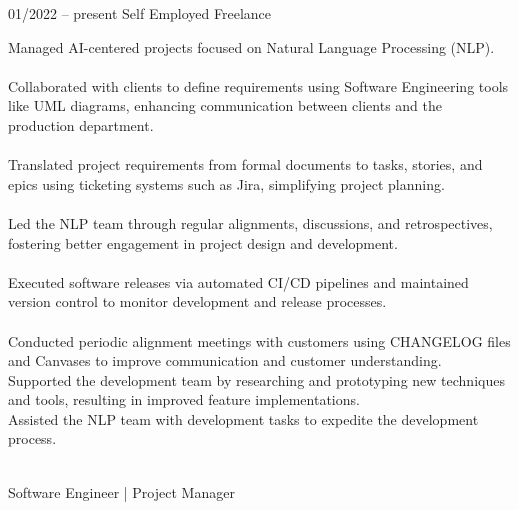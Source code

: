 \documentclass[9pt, green]{template/developercv} %
\begin{document}
{\begin{entrylist}
	\entry
{01/2022 -- present }
{}
{Self Employed \space\cpipe\space Freelance}
{
	\vspace{0.3mm}
	\begin{minipage}[t]{0.75\textwidth}				
		\vspace{-\baselineskip}
		\itemmarker Managed AI-centered projects focused on Natural Language Processing (NLP).\\
		\vspace{-3mm}\\
		\itemmarker Collaborated with clients to define requirements using Software Engineering tools like UML diagrams, enhancing communication between clients and the production department.\\
		\vspace{-3mm}\\
		\itemmarker Translated project requirements from formal documents to tasks, stories, and epics using ticketing systems such as Jira, simplifying project planning.\\
		\vspace{-3mm}\\
		\itemmarker Led the NLP team through regular alignments, discussions, and retrospectives, fostering better engagement in project design and development.\\
		\vspace{-3mm}\\
		\itemmarker Executed software releases via automated CI/CD pipelines and maintained version control to monitor development and release processes.\\
        \vspace{-3mm}\\
		\itemmarker Conducted periodic alignment meetings with customers using CHANGELOG files and Canvases to improve communication and customer understanding.\\
		\itemmarker Supported the development team by researching and prototyping new techniques and tools, resulting in improved feature implementations.\\
		\itemmarker Assisted the NLP team with development tasks to expedite the development process.\\	
\vspace{-3mm}\\  
	\end{minipage}
	
}
{Software Engineer | Project Manager}


\end{entrylist}}
\end{document}
